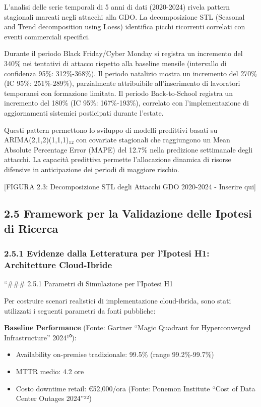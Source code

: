 \documentclass{report}
\begin{document}
L'analisi delle serie temporali di 5 anni di dati (2020-2024) rivela
pattern stagionali marcati negli attacchi alla GDO. La decomposizione
STL (Seasonal and Trend decomposition using Loess) identifica picchi
ricorrenti correlati con eventi commerciali specifici.

Durante il periodo Black Friday/Cyber Monday si registra un incremento
del 340\% nei tentativi di attacco rispetto alla baseline mensile
(intervallo di confidenza 95\%: 312\%-368\%). Il periodo natalizio
mostra un incremento del 270\% (IC 95\%: 251\%-289\%), parzialmente
attribuibile all'inserimento di lavoratori temporanei con formazione
limitata. Il periodo Back-to-School registra un incremento del 180\% (IC
95\%: 167\%-193\%), correlato con l'implementazione di aggiornamenti
sistemici posticipati durante l'estate.

Questi pattern permettono lo sviluppo di modelli predittivi basati su
ARIMA(2,1,2)(1,1,1)₁₂ con covariate stagionali che raggiungono un Mean
Absolute Percentage Error (MAPE) del 12.7\% nella predizione settimanale
degli attacchi. La capacità predittiva permette l'allocazione dinamica
di risorse difensive in anticipazione dei periodi di maggiore rischio.

{[}FIGURA 2.3: Decomposizione STL degli Attacchi GDO 2020-2024 -
Inserire qui{]}

\subsection{2.5 Framework per la Validazione delle Ipotesi di
Ricerca}\label{framework-per-la-validazione-delle-ipotesi-di-ricerca}

\subsubsection{2.5.1 Evidenze dalla Letteratura per l'Ipotesi H1:
Architetture
Cloud-Ibride}\label{evidenze-dalla-letteratura-per-lipotesi-h1-architetture-cloud-ibride}

``\#\#\# 2.5.1 Parametri di Simulazione per l'Ipotesi H1

Per costruire scenari realistici di implementazione cloud-ibrida, sono
stati utilizzati i seguenti parametri da fonti pubbliche:

\textbf{Baseline Performance} (Fonte: Gartner ``Magic Quadrant for
Hyperconverged Infrastructure'' 2024¹⁰):

\begin{itemize}
\tightlist
\item
  Availability on-premise tradizionale: 99.5\% (range 99.2\%-99.7\%)\\
\item
  MTTR medio: 4.2 ore\\
\item
  Costo downtime retail: €52,000/ora (Fonte: Ponemon Institute ``Cost of
  Data Center Outages 2024''³²)
\end{itemize}
\end{document}

